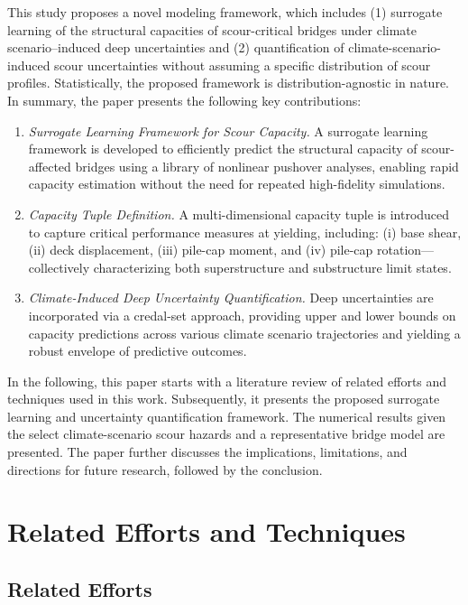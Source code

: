 \documentclass[authoryear,preprint,review,12pt]{elsarticle}
\begin{document}
This study proposes a novel modeling framework, which includes (1) surrogate learning of the structural capacities of scour-critical bridges under climate scenario–induced deep uncertainties and (2) quantification of climate-scenario-induced scour uncertainties without assuming a specific distribution of scour profiles. Statistically, the proposed framework is distribution-agnostic in nature. In summary, the paper presents the following key contributions:
\begin{enumerate}
    \item \textit{Surrogate Learning Framework for Scour Capacity.} A surrogate learning framework is developed to efficiently predict the structural capacity of scour-affected bridges using a library of nonlinear pushover analyses, enabling rapid capacity estimation without the need for repeated high-fidelity simulations.
    \item \textit{Capacity Tuple Definition.} A multi-dimensional capacity tuple is introduced to capture critical performance measures at yielding, including: (i) base shear, (ii) deck displacement, (iii) pile-cap moment, and (iv) pile-cap rotation—collectively characterizing both superstructure and substructure limit states.
    \item \textit{Climate-Induced Deep Uncertainty Quantification.} Deep uncertainties are incorporated via a credal-set approach, providing upper and lower bounds on capacity predictions across various climate scenario trajectories and yielding a robust envelope of predictive outcomes.
\end{enumerate}

In the following, this paper starts with a literature review of related efforts and techniques used in this work. Subsequently, it presents the proposed surrogate learning and uncertainty quantification framework. The numerical results given the select climate-scenario scour hazards and a representative bridge model are presented. The paper further discusses the implications, limitations, and directions for future research, followed by the conclusion. 

\section{Related Efforts and Techniques}
\subsection{Related Efforts}
\end{document}
